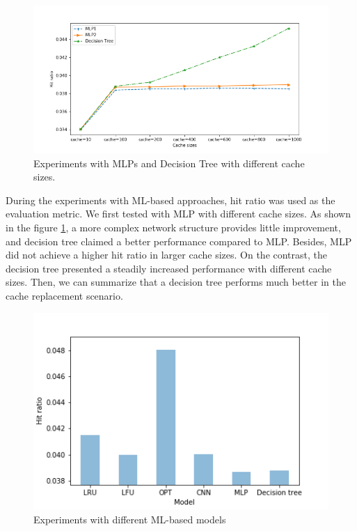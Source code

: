 \documentclass[letterpaper,twocolumn,10pt]{article}
\begin{document}
\begin{figure}[!ht]
	\centering 
	\includegraphics[width=0.38\textheight]{NN_hit.png}
	\caption{ Experiments with MLPs and Decision Tree with different cache sizes.
}
	\label{fig:nn_hit}
\end{figure}

During the experiments with ML-based approaches, hit ratio was used as the evaluation metric. We first tested with MLP with different cache sizes. As shown in the figure \ref{fig:nn_hit}, a more complex network structure provides little improvement, and decision tree claimed a better performance compared to MLP. Besides, MLP did not achieve a higher hit ratio in larger cache sizes. On the contrast, the decision tree presented a steadily increased performance with different cache sizes. Then, we can summarize that a decision tree performs much better in the cache replacement scenario.

\begin{figure}[!ht]
	\centering 
	\includegraphics[width=0.38\textheight]{CNN_DNN_DT.png}
	\caption{Experiments with different ML-based models
}
	\label{fig:cnn_dnn_dt}
\end{figure}
\end{document}
